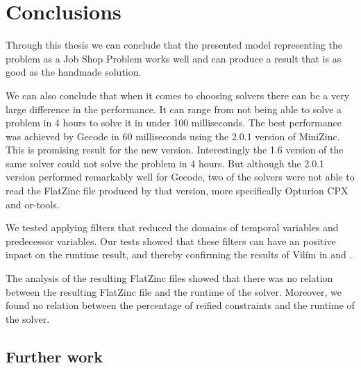 \chapter{Conclusions} \label{cha:conc}
Through this thesis we can conclude that the presented model representing the problem as a Job Shop Problem works well and can produce a result that is as good as the handmade solution.

We can also conclude that when it comes to choosing solvers there can be a very large difference in the performance. It can range from not being able to solve a problem in 4 hours to solve it in under 100 milliseconds. The best performance was achieved by Gecode in 60 milliseconds using the 2.0.1 version of MiniZinc. This is promising result for the new version. Interestingly the 1.6 version of the same solver could not solve the problem in 4 hours. But although the 2.0.1 version performed remarkably well for Gecode, two of the solvers were not able to read the FlatZinc file produced by that version, more specifically Opturion CPX and or-tools.

We tested applying filters that reduced the domains of temporal variables and predecessor variables. Our tests showed that these filters can have an positive inpact on the runtime result, and thereby confirming the results of Vilím in \cite{VilimBartak2002Batch} \cite{Vilim2002Precedence} and \cite{VilimBartak2002Sequence}.

The analysis of the resulting FlatZinc files showed that there was no relation between the resulting FlatZinc file and the runtime of the solver. Moreover, we found no relation between the percentage of reified constraints and the runtime of the solver.


\section{Further work}

